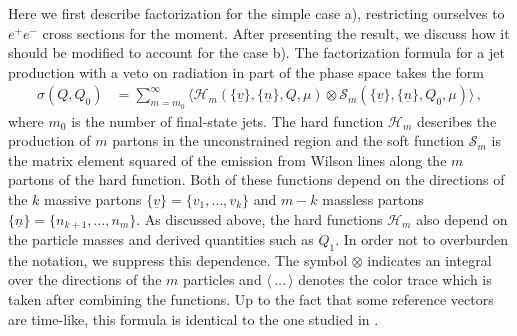 \documentclass[11pt,a4paper]{article}
\begin{document}
Here we first describe factorization for the simple case a), restricting ourselves to $e^+e^-$ cross sections for the moment. After presenting the result, we discuss how it should be modified to account for the case b). The factorization formula for a jet production with a veto on radiation in part of the phase space takes the form
\begin{align}\label{eq:Q_1}
\sigma(Q, Q_0) &=  \sum_{m=m_0}^\infty \big\langle \bm{\mathcal{H}}_m(\{\underline{v}\},\{\underline{n}\},Q,\mu) \otimes \bm{\mathcal{S}}_m(\{\underline{v}\},\{\underline{n}\},Q_0,\mu) \big\rangle\, ,
\end{align}
where $m_0$ is the number of final-state jets. The hard function $\bm{\mathcal{H}}_m$ describes the production of $m$ partons in the unconstrained region and the soft function $\bm{\mathcal{S}}_m$ is the matrix element squared of the emission from Wilson lines along the $m$ partons of the hard function. Both of these functions depend on the directions of the $k$ massive partons $\{\underline{v}\}=\{v_{1},\dots,v_k\}$ and $m-k$ massless partons $\{\underline{n}\}=\{n_{k+1},\dots,n_m\}$. As discussed above, the hard functions $\bm{\mathcal{H}}_m$ also depend on the particle masses and derived quantities such as $Q_1$. In order not to overburden the notation, we suppress this dependence. The symbol $\otimes$ indicates an integral over the directions of the $m$ particles and $\langle \,\dots\, \rangle$ denotes the color trace which is taken after combining the functions. Up to the fact that some reference vectors are time-like, this formula is identical to the one studied in \cite{Becher:2016mmh,Balsiger:2018ezi,Balsiger:2019tne}.
\end{document}
